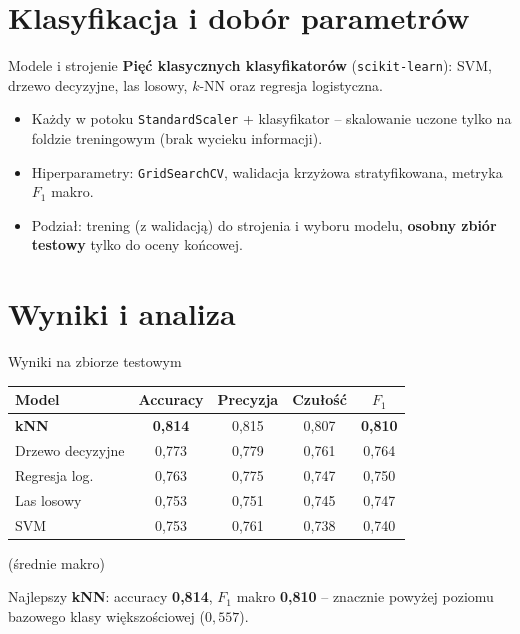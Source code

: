 \documentclass[aspectratio=1610, polish]{beamer}
\begin{document}
\section{Klasyfikacja i dobór parametrów}
\begin{frame}{Modele i strojenie}
    \textbf{Pięć klasycznych klasyfikatorów} (\texttt{scikit-learn}): SVM, drzewo
    decyzyjne, las losowy, $k$-NN oraz regresja logistyczna.
    \vspace{0.4cm}
    \begin{itemize}
        \item Każdy w potoku \texttt{StandardScaler} + klasyfikator -- skalowanie
              uczone tylko na foldzie treningowym (brak wycieku informacji).
        \pause
        \item Hiperparametry: \texttt{GridSearchCV}, walidacja krzyżowa
              stratyfikowana, metryka $F_1$ makro.
        \pause
        \item Podział: trening (z walidacją) do strojenia i wyboru modelu,
              \textbf{osobny zbiór testowy} tylko do oceny końcowej.
    \end{itemize}
\end{frame}

\section{Wyniki i analiza}
\begin{frame}{Wyniki na zbiorze testowym}
    \centering
    \begin{table}\small
    \begin{tabular}{lcccc}
        \toprule
        Model & Accuracy & Precyzja & Czułość & $F_1$ \\
        \midrule
        \textbf{kNN}      & \textbf{0,814} & 0,815 & 0,807 & \textbf{0,810} \\
        Drzewo decyzyjne  & 0,773 & 0,779 & 0,761 & 0,764 \\
        Regresja log.     & 0,763 & 0,775 & 0,747 & 0,750 \\
        Las losowy        & 0,753 & 0,751 & 0,745 & 0,747 \\
        SVM               & 0,753 & 0,761 & 0,738 & 0,740 \\
        \bottomrule
    \end{tabular}
    \end{table}
    \footnotesize (średnie makro)
    \vspace{0.3cm}
    \pause

    \normalsize Najlepszy \textbf{kNN}: accuracy \textbf{0,814}, $F_1$ makro
    \textbf{0,810} -- znacznie powyżej poziomu bazowego klasy większościowej
    ($0{,}557$).
\end{frame}
\end{document}
